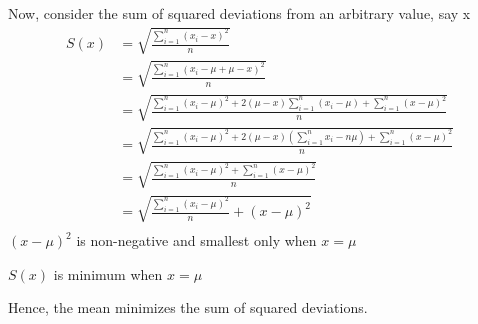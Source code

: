 \documentclass[12pt,letterpaper]{article}
\begin{document}
\begin{enumerate}[label=\textbf{Q\arabic*}, itemsep=30pt]
  Now, consider the sum of squared deviations from an arbitrary value, say x
  \begin{align*}
    S(x) &= \sqrt{\frac{\sum_{i=1}^{n} (x_i - x)^2}{n}} \\
    &= \sqrt{\frac{\sum_{i=1}^{n} (x_i - \mu + \mu - x)^2}{n}} \\
    &= \sqrt{\frac{\sum_{i=1}^{n} (x_i - \mu)^2 + 2(\mu - x)\sum_{i=1}^{n} (x_i - \mu) + \sum_{i=1}^{n} (x - \mu)^2}{n}} \\
    &= \sqrt{\frac{\sum_{i=1}^{n} (x_i - \mu)^2 + 2(\mu - x)(\sum_{i=1}^{n} x_i - n\mu) + \sum_{i=1}^{n} (x - \mu)^2}{n}} \\
    &= \sqrt{\frac{\sum_{i=1}^{n} (x_i - \mu)^2 + \sum_{i=1}^{n} (x - \mu)^2}{n}} \\
    &= \sqrt{\frac{\sum_{i=1}^{n} (x_i - \mu)^2}{n} + (x - \mu)^2} \\
  \end{align*}
  $(x - \mu)^2$ is non-negative and smallest only when $x = \mu$

  $S(x)$ is minimum when $x = \mu$

  Hence, the mean minimizes the sum of squared deviations.

\end{enumerate}
\end{document}

